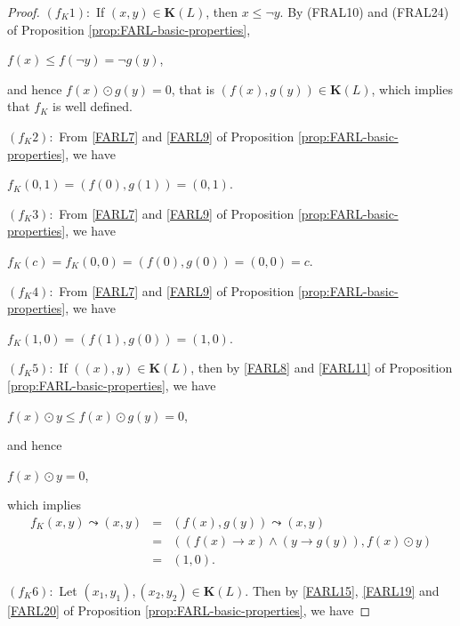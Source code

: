 \documentclass[final,12pt,times]{elsarticle}
\theoremstyle{plain}
\theoremstyle{definition}
\theoremstyle{break}
\begin{document}
\begin{proof} $(f_K1)$:\ If $(x,y)\in \mathbf{K}(L)$, then $x\leq {\neg}y$. By (FRAL10) and (FRAL24) of Proposition \ref{prop:FARL-basic-properties}, 
\begin{center} $f(x)\leq f({\neg}y)={\neg}g (y)$,
\end{center} and hence $f(x)\odot g(y)=0$, that is $(f(x),g(y))\in \mathbf{K}(L)$, which implies that $f_K$ is well defined.

$(f_K2)$:\ From \ref{FARL7} and \ref{FARL9} of Proposition \ref{prop:FARL-basic-properties}, we have

\begin{center} $f_K(0,1)=(f(0),g(1))=(0,1)$.
\end{center}

$(f_K3)$:\ From \ref{FARL7} and \ref{FARL9} of Proposition \ref{prop:FARL-basic-properties}, we have

\begin{center} $f_K(c)=f_K(0,0)=(f(0),g(0))=(0,0)=c$.
\end{center}

$(f_K4)$:\ From \ref{FARL7} and \ref{FARL9} of Proposition \ref{prop:FARL-basic-properties}, we have 
\begin{center} $f_K(1,0)=(f(1),g(0))=(1,0)$.
\end{center}

$(f_K5)$:\ If $((x),y)\in \mathbf{K}(L)$, then by \ref{FARL8} and \ref{FARL11} of Proposition \ref{prop:FARL-basic-properties}, we have 
\begin{center}
$f (x)\odot y\leq f(x)\odot g(y)=0$,
\end{center}
and hence
\begin{center} $f(x)\odot y=0$, 
\end{center}
which implies
\begin{eqnarray*}
               f_K(x,y)\leadsto (x,y)&=& (f(x), g(y))\leadsto(x,y)\\&=& ((f(x)\rightarrow x)\wedge(y\rightarrow g(y)),f(x)\odot y)\\&=&(1,0).
                \end{eqnarray*}

$(f_K6)$:\ Let $(x_1,y_1),(x_2,y_2)\in \mathbf{K}(L)$. Then by \ref{FARL15}, \ref{FARL19} and \ref{FARL20} of Proposition \ref{prop:FARL-basic-properties}, we have


\end{proof}
\end{document}
